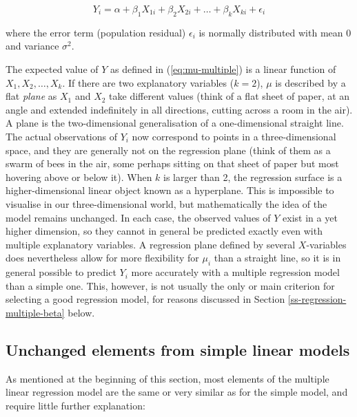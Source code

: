 \documentclass[11pt,a4paper,openany]{book}
\begin{document}
\begin{equation}Y_{i} = \alpha
+\beta_{1}X_{1i}+\beta_{2}X_{2i}+\dots+\beta_{k}X_{ki}+\epsilon_{i}
\label{eq:mlinmodel}\end{equation}

where the error term (population residual) \(\epsilon_{i}\) is normally
distributed with mean 0 and variance \(\sigma^{2}\).

The expected value of \(Y\) as defined in (\ref{eq:mu-multiple}) is a
linear function of \(X_{1}, X_{2}, \dots, X_{k}\). If there are two
explanatory variables (\(k=2\)), \(\mu\) is described by a flat
\emph{plane} as \(X_{1}\) and \(X_{2}\) take different values (think of
a flat sheet of paper, at an angle and extended indefinitely in all
directions, cutting across a room in the air). A plane is the
two-dimensional generalisation of a one-dimensional straight line. The
actual observations of \(Y_{i}\) now correspond to points in a
three-dimensional space, and they are generally not on the regression
plane (think of them as a swarm of bees in the air, some perhaps sitting
on that sheet of paper but most hovering above or below it). When \(k\)
is larger than 2, the regression surface is a higher-dimensional linear
object known as a hyperplane. This is impossible to visualise in our
three-dimensional world, but mathematically the idea of the model
remains unchanged. In each case, the observed values of \(Y\) exist in a
yet higher dimension, so they cannot in general be predicted exactly
even with multiple explanatory variables. A regression plane defined by
several \(X\)-variables does nevertheless allow for more flexibility for
\(\mu_{i}\) than a straight line, so it is in general possible to
predict \(Y_{i}\) more accurately with a multiple regression model than
a simple one. This, however, is not usually the only or main criterion
for selecting a good regression model, for reasons discussed in Section
\ref{ss-regression-multiple-beta} below.

\subsection{Unchanged elements from simple linear
models}\label{ss-regression-multiple-unchanged}

As mentioned at the beginning of this section, most elements of the
multiple linear regression model are the same or very similar as for the
simple model, and require little further explanation:
\end{document}
